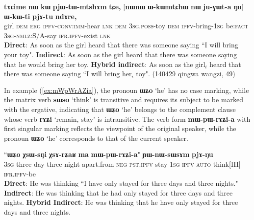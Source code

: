 \documentclass[oneside,a4paper,11pt]{article}
\newcommand{\ipa}[1]{\textbf{\phon#1}} %
\newcommand{\jpg}[2]{\ipa{#1} `#2'} %
\newcommand{\bleu}[1]{{\color{blue}#1}}
\newcommand{\rouge}[1]{{\color{red}#1}}
\newcommand{\refb}[1]{(\ref{#1})}
\begin{document}
\begin{exe}
\ex \label{ex:juGWta}
\gll   \ipa{tɤɕime}  	\ipa{nɯ}  	\ipa{kɯ}  	\ipa{pjɯ-tɯ-mtshɤm}  	\ipa{tɕe,}  	[\ipa{nɯnɯ}  \rouge{\ipa{ɯ-kɯmtɕhɯ}}  	\ipa{nɯ}  	\bleu{\ipa{ju-ɣɯt-a}}  	\ipa{ŋu}]  		\ipa{ɯ-kɯ-ti}  	\ipa{pjɤ-tu}  	\ipa{ndɤre,}  \\
girl \textsc{dem} \textsc{erg} \textsc{ipfv-conv:imm}-hear \textsc{lnk} \textsc{dem} {\textsc{3sg.poss}-toy} \textsc{dem} {\textsc{ipfv}-bring-\textsc{1sg}}  be:\textsc{fact} \textsc{3sg-nmlz}:S/A-say \textsc{ifr.ipfv}-exist \textsc{lnk} \\
\glt   \textbf{Direct}: As soon as the girl heard that there was someone saying ``\bleu{I will bring your toy}".
\glt   \textbf{Indirect}:  As soon as the girl heard that there was someone saying that \rouge{he would bring her toy}.
\glt   \textbf{Hybrid indirect}: As soon as the girl$_i$ heard that there was someone saying ``\bleu{I will bring} \rouge{her$_i$ toy}". (140429 qingwa wangzi, 49)
  \end{exe}


In example \refb{ex:mWpWrAZia}, the pronoun \jpg{ɯʑo}{he} has no case marking, while the matrix verb \jpg{sɯso}{think} is transitive and requires its subject to be marked with the ergative, indicating that \jpg{ɯʑo}{he} belongs to the complement clause whose verb \jpg{rɤʑi}{remain, stay} is intransitive. The verb form \ipa{mɯ-pɯ-rɤʑi-a} with first singular marking reflects the viewpoint of the original speaker, while the pronoun \jpg{ɯʑo}{he} corresponds to that of the current speaker. 
  
\begin{exe}
\ex \label{ex:mWpWrAZia}
\gll  ``\bleu{\ipa{ɯʑo}}  	\ipa{χsɯ-sŋi}  	\ipa{χsɤ-rʑaʁ}  	\ipa{ma}  	\rouge{\ipa{mɯ-pɯ-rɤʑi-a}}"  	\ipa{ɲɯ-nɯ-sɯsɤm}  	\ipa{pjɤ-ŋu}  \\
{\textsc{3sg}} three-day  three-night apart.from {\textsc{neg-pst.ipfv}-stay-\textsc{1sg}} \textsc{ipfv-auto}-think[III] \textsc{ifr.ipfv}-be \\
\glt    \textbf{Direct}: He was thinking ``\bleu{I {have} only {stayed} for three days and three nights.}"
\glt    \textbf{Indirect}: He was thinking that \rouge{he had only stayed for three days and three nights}.
\glt  \textbf{Hybrid Indirect}: He was thinking that \rouge{he} \bleu{have} only {stayed} for three days and three nights. 
\end{exe}
  
\end{document}
